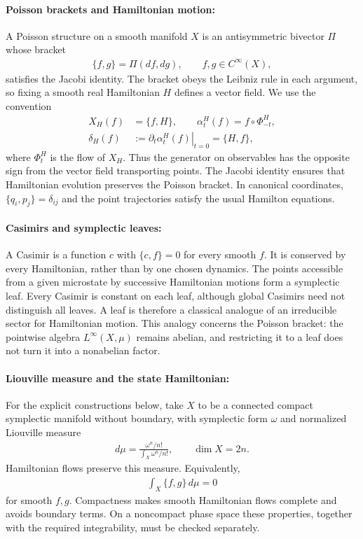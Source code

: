 \documentclass[a4paper,11pt]{article}
\theoremstyle{definition}
\newcommand{\nn}{\nonumber}
\begin{document}
\paragraph{Poisson brackets and Hamiltonian motion:}
A Poisson structure on a smooth manifold $X$ is an antisymmetric bivector $\Pi$ whose bracket
\begin{align}
    \{f,g\}=\Pi(df,dg),\qquad f,g\in C^\infty(X),
\end{align}
satisfies the Jacobi identity. The bracket obeys the Leibniz rule in each argument, so fixing a smooth real Hamiltonian $H$ defines a vector field. We use the convention
\begin{align}\label{eq:classical-Hamiltonian-convention}
    X_H(f)&=\{f,H\},\qquad
    \alpha_t^H(f)=f\circ\Phi_{-t}^H,\nn\\
    \delta_H(f)&:=\left.\partial_t\alpha_t^H(f)\right|_{t=0}=\{H,f\},
\end{align}
where $\Phi_t^H$ is the flow of $X_H$. Thus the generator on observables has the opposite sign from the vector field transporting points. The Jacobi identity ensures that Hamiltonian evolution preserves the Poisson bracket. In canonical coordinates, $\{q_i,p_j\}=\delta_{ij}$ and the point trajectories satisfy the usual Hamilton equations.

\paragraph{Casimirs and symplectic leaves:}
A Casimir is a function $c$ with $\{c,f\}=0$ for every smooth $f$. It is conserved by every Hamiltonian, rather than by one chosen dynamics. The points accessible from a given microstate by successive Hamiltonian motions form a symplectic leaf. Every Casimir is constant on each leaf, although global Casimirs need not distinguish all leaves. A leaf is therefore a classical analogue of an irreducible sector for Hamiltonian motion. This analogy concerns the Poisson bracket: the pointwise algebra $L^\infty(X,\mu)$ remains abelian, and restricting it to a leaf does not turn it into a nonabelian factor.

\paragraph{Liouville measure and the state Hamiltonian:}
For the explicit constructions below, take $X$ to be a connected compact symplectic manifold without boundary, with symplectic form $\omega$ and normalized Liouville measure
\begin{align}
    d\mu=\frac{\omega^n/n!}{\int_X\omega^n/n!},\qquad \dim X=2n.
\end{align}
Hamiltonian flows preserve this measure. Equivalently,
\begin{align}\label{statepreserve}
    \int_X\{f,g\}\,d\mu=0
\end{align}
for smooth $f,g$. Compactness makes smooth Hamiltonian flows complete and avoids boundary terms. On a noncompact phase space these properties, together with the required integrability, must be checked separately.
\end{document}
